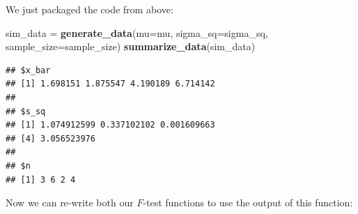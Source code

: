 \documentclass[
]{book}
\newenvironment{Shaded}{\begin{snugshade}}{\end{snugshade}}
\newcommand{\AttributeTok}[1]{\textcolor[rgb]{0.13,0.29,0.53}{#1}}
\newcommand{\ControlFlowTok}[1]{\textcolor[rgb]{0.13,0.29,0.53}{\textbf{#1}}}
\newcommand{\FunctionTok}[1]{\textcolor[rgb]{0.13,0.29,0.53}{\textbf{#1}}}
\newcommand{\NormalTok}[1]{#1}
\newcommand{\OtherTok}[1]{\textcolor[rgb]{0.56,0.35,0.01}{#1}}
\newcommand{\SpecialCharTok}[1]{\textcolor[rgb]{0.81,0.36,0.00}{\textbf{#1}}}
\begin{document}
\begin{Shaded}
\end{Shaded}

We just packaged the code from above:

\begin{Shaded}
\begin{Highlighting}[]
\NormalTok{sim\_data }\OtherTok{=} \FunctionTok{generate\_data}\NormalTok{(}\AttributeTok{mu=}\NormalTok{mu, }\AttributeTok{sigma\_sq=}\NormalTok{sigma\_sq, }\AttributeTok{sample\_size=}\NormalTok{sample\_size)}
\FunctionTok{summarize\_data}\NormalTok{(sim\_data)}
\end{Highlighting}
\end{Shaded}

\begin{verbatim}
## $x_bar
## [1] 1.698151 1.875547 4.190189 6.714142
## 
## $s_sq
## [1] 1.074912599 0.337102102 0.001609663
## [4] 3.056523976
## 
## $n
## [1] 3 6 2 4
\end{verbatim}

Now we can re-write both our \(F\)-test functions to use the output of this function:
\end{document}
